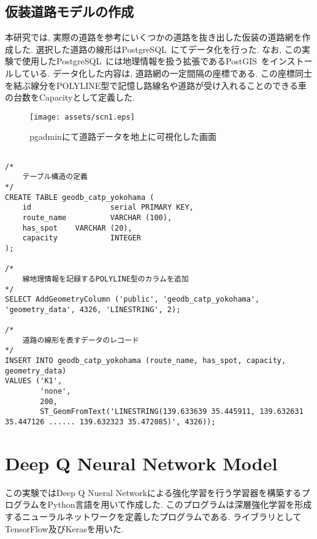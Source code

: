 \subsection{仮装道路モデルの作成}

本研究では, 実際の道路を参考にいくつかの道路を抜き出した仮装の道路網を作成した.
選択した道路の線形はPostgreSQL~\cite{pgsql}にてデータ化を行った. なお, この実験で使用したPostgreSQL~\cite{pgsql}には地理情報を扱う拡張であるPostGIS~\cite{postgis}をインストールしている.
データ化した内容は, 道路網の一定間隔の座標である. この座標同士を結ぶ線分をPOLYLINE型で記憶し路線名や道路が受け入れることのできる車の台数をCapacityとして定義した.


\begin{figure}[H]
  \centering  %
  \texttt{[image: assets/scn1.eps]}
  \caption{pgadminにて道路データを地上に可視化した画面}  \label{system_overview}
\end{figure}



\begin{lstlisting}[caption = 路線データを表すクエリーの例, label = program1]

/*
    テーブル構造の定義
*/
CREATE TABLE geodb_catp_yokohama (
    id                  serial PRIMARY KEY,
    route_name          VARCHAR (100),
    has_spot    VARCHAR (20),
    capacity            INTEGER
);

/*
    線地理情報を記録するPOLYLINE型のカラムを追加
*/
SELECT AddGeometryColumn ('public', 'geodb_catp_yokohama', 'geometry_data', 4326, 'LINESTRING', 2);

/*
    道路の線形を表すデータのレコード
*/
INSERT INTO geodb_catp_yokohama (route_name, has_spot, capacity, geometry_data)
VALUES ('K1',
        'none',
        200,
        ST_GeomFromText('LINESTRING(139.633639 35.445911, 139.632631 35.447126 ...... 139.632323 35.472085)', 4326));
\end{lstlisting}



\section{Deep Q Neural Network Model}

この実験ではDeep Q Nueral Networkによる強化学習を行う学習器を構築するプログラムをPython言語を用いて作成した.
このプログラムは深層強化学習を形成するニューラルネットワークを定義したプログラムである.
ライブラリとしてTensorFlow及びKerasを用いた.


